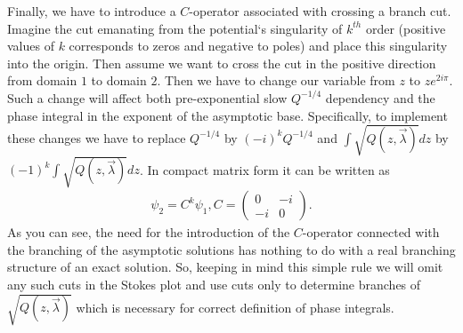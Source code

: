 \documentclass[aps,prl,preprint,superscriptaddress]{revtex4}
\begin{document}
Finally, we have to introduce a $C$-operator associated with crossing a branch cut. Imagine the cut emanating from the potential`s singularity of $k^{th}$ order (positive values of $k$ corresponds to zeros and negative to poles) and place this singularity into the origin. Then assume we want to cross the cut in the positive direction from domain $1$ to domain $2$. Then we have to change our variable from $z$ to $z e^{2i\pi}$. Such a change will affect both pre-exponential slow $Q^{-1/4}$ dependency and the phase integral in the exponent of the asymptotic base. Specifically, to implement these changes we have to replace $Q^{-1/4}$ by $(-i)^k Q^{-1/4}$ 
and $\int \sqrt{Q(z,\vec{\lambda})} dz$ by $(-1)^k \int \sqrt{Q(z,\vec{\lambda})} dz$. In compact matrix form it can be written as
\begin{eqnarray}
\psi_2 = C^k \psi_1, C =  \begin{pmatrix} 0 & -i \\ -i & 0 \end{pmatrix}.    \label{C}
\end{eqnarray}
As you can see, the need for the introduction of the $C$-operator connected with the branching of the asymptotic solutions has nothing to do with a real branching structure of an exact solution. So, keeping in mind this simple rule we will omit any such cuts in the Stokes plot and use cuts only to determine branches of $\sqrt{Q(z,\vec \lambda)}$ which is necessary for correct definition of phase integrals. 
\end{document}
